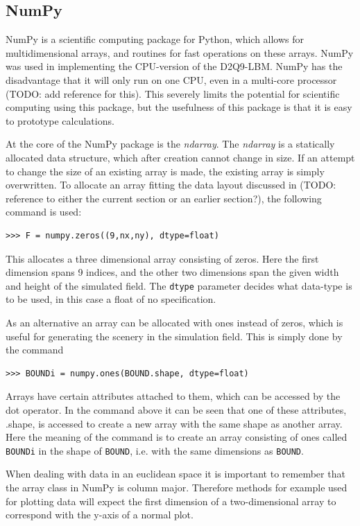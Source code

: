 \subsection{NumPy}
NumPy is a scientific computing package for Python, which allows for multidimensional arrays, and routines for fast operations on these arrays. NumPy was used in implementing the CPU-version of the D2Q9-LBM. NumPy has the disadvantage that it will only run on one CPU, even in a multi-core processor (TODO: add reference for this). This severely limits the potential for scientific computing using this package, but the usefulness of this package is that it is easy to prototype calculations.

At the core of the NumPy package is the \textit{ndarray}. The \textit{ndarray} is a statically allocated data structure, which after creation cannot change in size. If an attempt to change the size of an existing array is made, the existing array is simply overwritten. To allocate an array fitting the data layout discussed in (TODO: reference to either the current section or an earlier section?), the following command is used:

\begin{verbatim}
>>> F = numpy.zeros((9,nx,ny), dtype=float)
\end{verbatim}

This allocates a three dimensional array consisting of zeros. Here the first dimension spans 9 indices, and the other two dimensions span the given width and height of the simulated field. The \texttt{dtype} parameter decides what data-type is to be used, in this case a float of no specification. 

As an alternative an array can be allocated with ones instead of zeros, which is useful for generating the scenery in the simulation field. This is simply done by the command

\begin{verbatim}
>>> BOUNDi = numpy.ones(BOUND.shape, dtype=float)
\end{verbatim}

Arrays have certain attributes attached to them, which can be accessed by the dot operator. In the command above it can be seen that one of these attributes, .shape, is accessed to create a new array with the same shape as another array. Here the meaning of the command is to create an array consisting of ones called \texttt{BOUNDi} in the shape of \texttt{BOUND}, i.e. with the same dimensions as \texttt{BOUND}.

When dealing with data in an euclidean space it is important to remember that the array class in NumPy is column major. Therefore methods for example used for plotting data will expect the first dimension of a two-dimensional array to correspond with the y-axis of a normal plot. 

